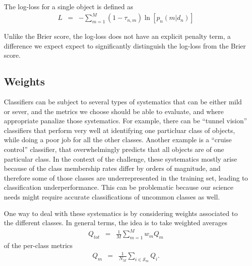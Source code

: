 The log-loss for a single object is defined as
\begin{eqnarray}
L &=& -\sum_{m=1}^{M}(1-\tau_{n, m})\ln[p_{n}(m | d_{n})]
\end{eqnarray}

Unlike the Brier score, the log-loss does not have an explicit penalty term, a difference we expect expect to significantly distinguish the log-loss from the Brier score.

%

\subsection{Weights}
\label{sec:weights}

Classifiers can be subject to several types of systematics that can be either mild or sever, and the metrics we choose should be able to evaluate, and where appropriate panalize those systematics. For example, there can be ``tunnel vision'' classifiers that perform very well at identifying one particluar class of objects, while doing a poor job for all the other classes. Another example is a ``cruise control'' classifier, that overwhelmingly predicts that all objects are of one particular class. In the context of the challenge, these systematics mostly arise because of the class membership rates differ by orders of magnitude, and therefore some of those classes are underrepresented in the training set, leading to classification underperformance. This can be problematic because our science needs might require accurate classifications of uncommon classes as well.

One way to deal with these systematics is by considering weights associated to the different classes. In general terms, the idea is to take weighted averages
\begin{eqnarray}
Q_{tot} &=& \frac{1}{M}\sum_{m=1}^{M}w_{m}Q_{m}
\end{eqnarray}
of the per-class metrics
\begin{eqnarray}
Q_{m} &=& \frac{1}{N_{M}}\sum_{i\in\mathcal{S}_{m}}Q_{i}.
\end{eqnarray}

